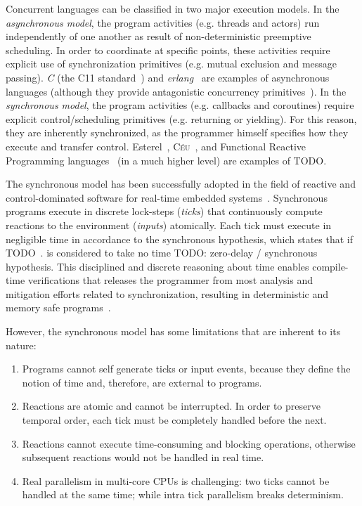 \documentclass[11pt,a4paper]{article}
\newcommand{\CEU}{\textsc{C\'{e}u}}
\begin{document}
Concurrent languages can be classified in two major execution models.
%
In the \emph{asynchronous model}, the program activities (e.g. threads and 
actors) run independently of one another as result of non-deterministic 
preemptive scheduling.
In order to coordinate at specific points, these activities require explicit 
use of synchronization primitives (e.g. mutual exclusion and message passing).
\emph{C} (the C11 standard~\cite{TODO}) and \emph{erlang}~\cite{TODO} are 
examples of asynchronous languages (although they provide antagonistic 
concurrency primitives~\cite{TODO}).
%
In the \emph{synchronous model}, the program activities (e.g. callbacks and 
coroutines) require explicit control/scheduling primitives (e.g. returning or 
yielding).
For this reason, they are inherently synchronized, as the programmer himself 
specifies how they execute and transfer control.
%
Esterel~\cite{TODO}, \CEU~\cite{TODO}, and Functional Reactive Programming 
languages~\cite{TODO,A,B} (in a much higher level) are examples of TODO.

The synchronous model has been successfully adopted in the field of reactive 
and control-dominated software for real-time embedded systems~\cite{rp.twelve}.
%
Synchronous programs execute in discrete lock-steps (\emph{ticks}) that 
continuously compute reactions to the environment (\emph{inputs}) atomically.
%
Each tick must execute in negligible time in accordance to the synchronous 
hypothesis, which states that if TODO~\cite{TODO}.
is considered to take no time
TODO: zero-delay / synchronous hypothesis.
%
This disciplined and discrete reasoning about time enables compile-time 
verifications that releases the programmer from most analysis and mitigation 
efforts related to synchronization, resulting in deterministic and memory safe 
programs~\cite{TODO}.

However, the synchronous model has some limitations that are inherent to its 
nature:
%
\begin{enumerate}
\item Programs cannot self generate ticks or input events, because they define 
        the notion of time and, therefore, are external to programs.
\item Reactions are atomic and cannot be interrupted.
        In order to preserve temporal order, each tick must be completely 
        handled before the next.
\item Reactions cannot execute time-consuming and blocking operations, 
        otherwise subsequent reactions would not be handled in real time.
\item Real parallelism in multi-core CPUs is challenging:
        two ticks cannot be handled at the same time;
        while intra tick parallelism breaks determinism.
\end{enumerate}
\end{document}
